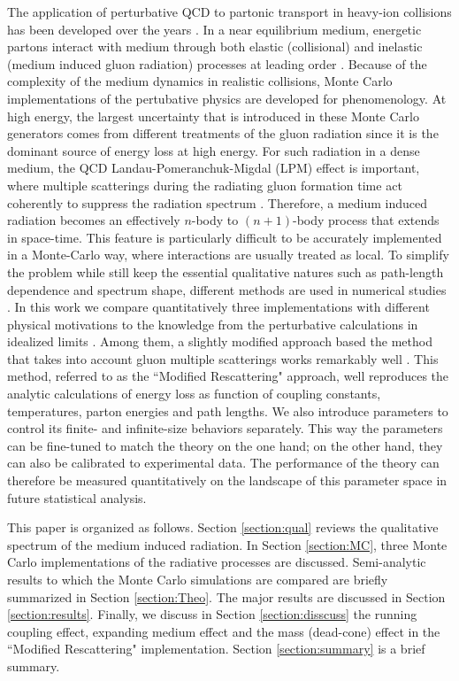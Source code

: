 \documentclass[aps, prc, reprint, amsmath, groupedaddress, nofootinbib]{revtex4-1}
\begin{document}
The application of perturbative QCD to partonic transport in heavy-ion collisions has been developed over the years \cite{Arnold:2002zm}.
In a near equilibrium medium, energetic partons interact with medium through both elastic (collisional) and inelastic (medium induced gluon radiation) processes at leading order \cite{Ghiglieri:2015ala}.
Because of the complexity of the medium dynamics in realistic collisions, Monte Carlo implementations of the pertubative physics are developed for phenomenology.
At high energy, the largest uncertainty that is introduced in these Monte Carlo generators comes from different treatments of the gluon radiation since it is the dominant source of energy loss at high energy.
For such radiation in a dense medium, the QCD Landau-Pomeranchuk-Migdal (LPM) effect is important, where multiple scatterings during the radiating gluon formation time act coherently to suppress the radiation spectrum \cite{PhysRev.103.1811,Wang:1994fx,Zakharov:1996fv,Baier:1996kr}.
Therefore, a medium induced radiation becomes an effectively $n$-body to $(n+1)$-body process that extends in space-time.
This feature is particularly difficult to be accurately implemented in a Monte-Carlo way, where interactions are usually treated as local.
To simplify the problem while still keep the essential qualitative natures such as path-length dependence and spectrum shape, different methods are used in numerical studies \cite{Djordjevic:2008iz,Cao:2013ita,ColemanSmith:2012vr,Xu:2004mz, Zapp:2011ya, Gossiaux:2012cv,Park:thesis}.
In this work we compare quantitatively three implementations with different physical motivations to the knowledge from the perturbative calculations in idealized limits \cite{Arnold:2008zu,Arnold:2009mr}.
Among them, a slightly modified approach based the method that takes into account gluon multiple scatterings works remarkably well \cite{Zapp:2011ya}.
This method, referred to as the ``Modified Rescattering" approach, well reproduces the analytic calculations of energy loss as function of coupling constants, temperatures, parton energies and path lengths.
We also introduce parameters to control its finite- and infinite-size behaviors separately.
This way the parameters can be fine-tuned to match the theory on the one hand; on the other hand, they can also be calibrated to experimental data.
The performance of the theory can therefore be measured quantitatively on the landscape of this parameter space in future statistical analysis.

This paper is organized as follows. Section \ref{section:qual} reviews the qualitative spectrum of the medium induced radiation.
In Section \ref{section:MC}, three Monte Carlo implementations of the radiative processes are discussed. 
Semi-analytic results to which the Monte Carlo simulations are compared are briefly summarized in Section \ref{section:Theo}.
The major results are discussed in Section \ref{section:results}.
Finally, we discuss in Section \ref{section:disscuss} the running coupling effect, expanding medium effect and the mass (dead-cone) effect in the ``Modified Rescattering" implementation. Section \ref{section:summary} is a brief summary.
\end{document}
